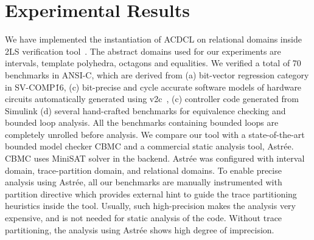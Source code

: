 \section{Experimental Results}
We have implemented the instantiation of ACDCL on relational domains 
inside 2LS verification tool~\cite{2ls}.  The abstract domains used for 
our experiments are intervals, template polyhedra, octagons and equalities.  
We verified a total of 70 benchmarks in ANSI-C, which are derived from 
(a) bit-vector regression category in SV-COMP\'16, (c) bit-precise and 
cycle accurate software models of hardware circuits automatically 
generated using v2c~\cite{mtk2016}, (c) controller code generated 
from Simulink (d) several hand-crafted benchmarks for equivalence 
checking and bounded loop analysis.  All the benchmarks containing 
bounded loops are completely unrolled before analysis.  We compare 
our tool with a state-of-the-art bounded model checker CBMC and a 
commercial static analysis tool, Astr{\'e}e.  CBMC uses MiniSAT 
solver in the backend.  Astr{\'e}e was configured with interval 
domain, trace-partition domain, and relational domains.  To enable precise 
analysis using Astr{\'e}e, all our benchmarks are manually instrumented with 
partition directive which provides external hint to guide the trace partitioning 
heuristics inside the tool.  Usually, such high-precision makes the analysis
very expensive, and is not needed for static analysis of the code.  Without trace 
partitioning, the analysis using Astr{\'e}e shows high degree of imprecision. 
  
